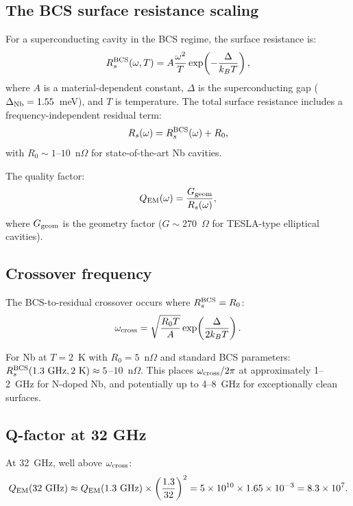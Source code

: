 \documentclass[11pt]{article}
\newcommand{\ee}[1]{\times 10^{#1}}
\newcommand{\QEM}{Q_{\rm EM}}
\begin{document}
\subsection{The BCS surface resistance scaling}

For a superconducting cavity in the BCS regime, the surface resistance is:
\begin{equation}
R_s^{\rm BCS}(\omega, T) = A \frac{\omega^2}{T}
\exp\!\left(-\frac{\Delta}{k_BT}\right),
\label{eq:Rs-BCS}
\end{equation}
where $A$ is a material-dependent constant, $\Delta$ is the superconducting
gap ($\Delta_{\rm Nb} = 1.55$~meV), and $T$ is temperature. The total
surface resistance includes a frequency-independent residual term:
\begin{equation}
R_s(\omega) = R_s^{\rm BCS}(\omega) + R_0,
\label{eq:Rs-total}
\end{equation}
with $R_0 \sim 1$--$10$~n$\Omega$ for state-of-the-art Nb cavities.

The quality factor:
\begin{equation}
\QEM(\omega) = \frac{G_{\rm geom}}{R_s(\omega)},
\label{eq:Q-definition}
\end{equation}
where $G_{\rm geom}$ is the geometry factor ($G \sim 270$~$\Omega$ for
TESLA-type elliptical cavities).

\subsection{Crossover frequency}

The BCS-to-residual crossover occurs where $R_s^{\rm BCS} = R_0$:
\begin{equation}
\omega_{\rm cross} = \sqrt{\frac{R_0 T}{A}}
\exp\!\left(\frac{\Delta}{2k_BT}\right).
\label{eq:omega-cross}
\end{equation}

For Nb at $T = 2$~K with $R_0 = 5$~n$\Omega$ and standard BCS parameters:
$R_s^{\rm BCS}(1.3~\text{GHz}, 2~\text{K}) \approx 5$--$10$~n$\Omega$.
This places $\omega_{\rm cross}/2\pi$ at approximately 1--2~GHz for
N-doped Nb, and potentially up to 4--8~GHz for exceptionally clean surfaces.

\subsection{Q-factor at 32 GHz}

At 32~GHz, well above $\omega_{\rm cross}$:
\begin{equation}
\QEM(32~\text{GHz}) \approx \QEM(1.3~\text{GHz}) \times
\left(\frac{1.3}{32}\right)^2 = 5\ee{10} \times 1.65\ee{-3}
= 8.3\ee{7}.
\end{equation}
\end{document}
